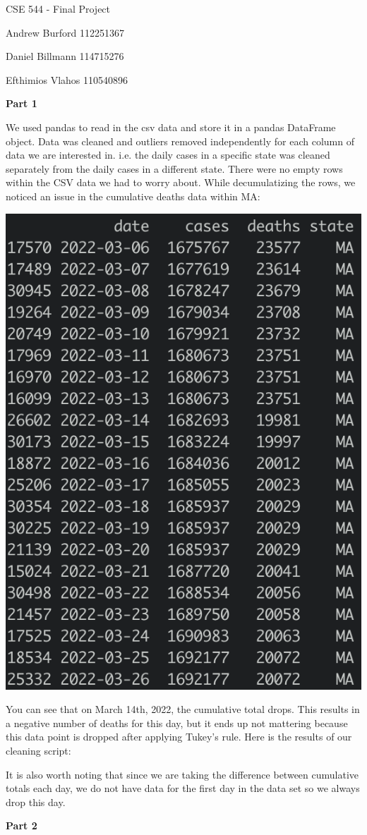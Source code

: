 \documentclass[12pt]{article}
\def\pp{\par\noindent}
\newcommand{\problem}[1]{\bigskip\pp\textbf{Part #1}\smallskip}
\begin{document}
\lstset{basicstyle=\small,language=Python,tabsize=2}
\centerline{CSE 544 - Final Project}
\centerline{Andrew Burford 112251367}
\centerline{Daniel Billmann 114715276}
\centerline{Efthimios Vlahos 110540896}

\problem{1}
\par We used pandas to read in the csv data and store it in a pandas
DataFrame object. Data was cleaned and outliers removed independently for each column of
data we are interested in. i.e. the daily cases in a specific state
was cleaned separately from the daily cases in a different state.
There were no empty rows within the CSV data we had to worry about.
While decumulatizing the rows, we noticed an issue in the cumulative
deaths data within MA:
\pp\includegraphics[scale=0.5]{cumulative_error.png}
\par You can see that on March 14th, 2022, the cumulative total drops.
This results in a negative number of deaths for this day, but it ends
up not mattering because this data point is dropped after applying
Tukey's rule. Here is the results of our cleaning script:

It is also worth noting that since we are taking the difference
between cumulative totals each day, we do not have data for the first
day in the data set so we always drop this day.
\problem{2}
\end{document}
